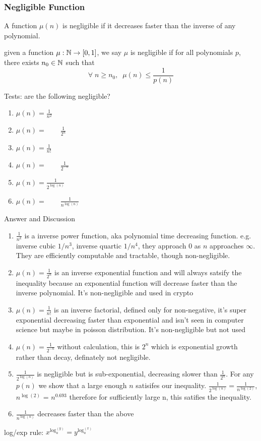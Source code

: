 \subsubsection*{Negligible Function}
A function $\mu(n)$ is negligible if it decreases faster than the inverse of any polynomial.
\begin{definition}
    given a function $\mu : \mathbb{N} \to [0,1]$, we say $\mu$ is negligible if for all polynomials $p$, there exists $n_0 \in \mathbb{N}$ such that 
$$
    \forall \; n \geq n_0,\;   \; \mu(n) \leq \frac{1}{p(n)}
$$
\end{definition}
Tests: are the following negligible?
\begin{enumerate}
    \item $\mu(n) = \frac{1}{n^2}$
    \item $\mu(n) = \qquad \frac{1}{2^n}$ 
    \item $\mu(n) = \frac{1}{n!}$ 
    \item $\mu(n) = \qquad \frac{1}{2^{-n}}$ 
    \item $\mu(n) = \frac{1}{2^{\log(n)}}$ 
    \item $\mu(n) = \qquad \frac{1}{n^{\log(n)}}$ 
\end{enumerate}

Answer and Discussion
\begin{enumerate}
    \item $\frac{1}{n^k}$ is a inverse power function, aka polynomial time decreasing function. e.g. inverse cubic $1/n^3$, inverse quartic $1/n^4$, they approach 0 as $n$ approaches $\infty$. They are efficiently computable and tractable, though non-negligible. \\
    \item $\mu(n) = \frac{1}{2^n}$ is an inverse exponential function and will always satsify the inequality because an exponential function will decrease faster than the inverse polynomial.  It's non-negligible and used in crypto\\
    \item $\mu(n) = \frac{1}{n!}$ is an inverse factorial, defined only for non-negative, it's super exponential decreasing faster than exponential and isn't seen in computer science but maybe in poisson distribution. It's non-negligible but not used \\
    \item $\mu(n) = \frac{1}{2^{-n}}$ without calculation, this is $2^n$ which is exponential growth rather than decay, definately not negligible. \\
    \item $\frac{1}{2^{\log(n)}}$ is negligible but is sub-exponential, decreasing slower than $\frac{1}{2^n}$. For any $p(n)$ we show that a large enough $n$ satisifes our inequality. $\frac{1}{2^{\log(n)}} = \frac{1}{n^{\log(2)}}$, $n^{\log(2)}$ = $n^{0.693}$ therefore for sufficiently large n, this satifies the inequality. \\
    \item $\frac{1}{n^{\log(n)}}$ decreases faster than the above
\end{enumerate}
log/exp rule: $x^{\log_a^{(y)}} = y^{\log_a^{(x)}}$

